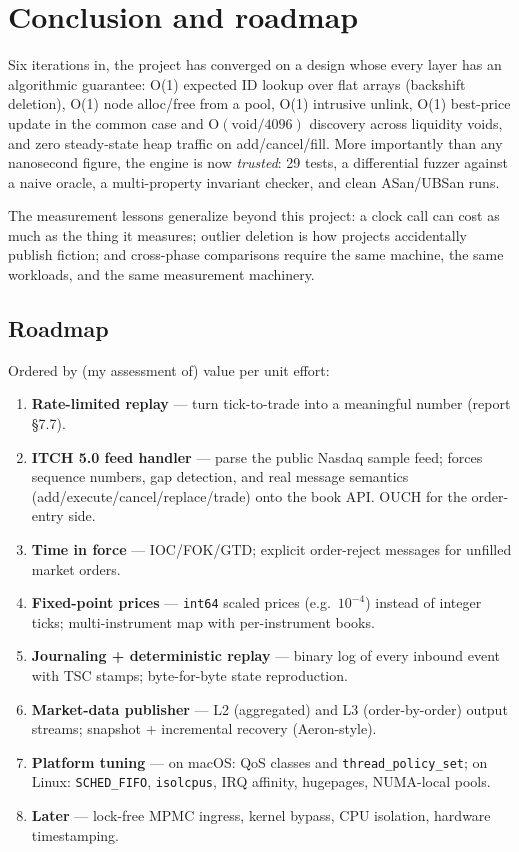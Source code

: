 \documentclass[11pt,a4paper]{article}
\begin{document}
\section{Conclusion and roadmap}\label{sec:conclusion}

Six iterations in, the project has converged on a design whose every layer
has an algorithmic guarantee: O(1) expected ID lookup over flat arrays
(backshift deletion), O(1) node alloc/free from a pool, O(1) intrusive
unlink, O(1) best-price update in the common case and O$(\text{void}/4096)$
discovery across liquidity voids, and zero steady-state heap traffic on
add/cancel/fill. More importantly than any nanosecond figure, the engine is
now \emph{trusted}: 29 tests, a differential fuzzer against a naive oracle,
a multi-property invariant checker, and clean ASan/UBSan runs.

The measurement lessons generalize beyond this project: a clock call can
cost as much as the thing it measures; outlier deletion is how projects
accidentally publish fiction; and cross-phase comparisons require the same
machine, the same workloads, and the same measurement machinery.

\subsection{Roadmap}

Ordered by (my assessment of) value per unit effort:

\begin{enumerate}
\item \textbf{Rate-limited replay} --- turn tick-to-trade into a meaningful
      number (report \S7.7).
\item \textbf{ITCH 5.0 feed handler} --- parse the public Nasdaq sample
      feed; forces sequence numbers, gap detection, and real message
      semantics (add/execute/cancel/replace/trade) onto the book API.
      OUCH for the order-entry side.
\item \textbf{Time in force} --- IOC/FOK/GTD; explicit order-reject
      messages for unfilled market orders.
\item \textbf{Fixed-point prices} --- \texttt{int64} scaled prices
      (e.g.\ $10^{-4}$) instead of integer ticks; multi-instrument map with
      per-instrument books.
\item \textbf{Journaling + deterministic replay} --- binary log of every
      inbound event with TSC stamps; byte-for-byte state reproduction.
\item \textbf{Market-data publisher} --- L2 (aggregated) and L3
      (order-by-order) output streams; snapshot + incremental recovery
      (Aeron-style).
\item \textbf{Platform tuning} --- on macOS: QoS classes and
      \texttt{thread\_policy\_set}; on Linux: \texttt{SCHED\_FIFO},
      \texttt{isolcpus}, IRQ affinity, hugepages, NUMA-local pools.
\item \textbf{Later} --- lock-free MPMC ingress, kernel bypass, CPU
      isolation, hardware timestamping.
\end{enumerate}
\end{document}
